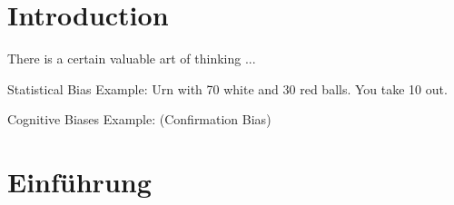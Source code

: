 \ifEnglish

\section{Introduction}


\begin{frame}[standout]
    There is a certain valuable art of thinking ...
\end{frame}



\begin{frame}[c]{Statistical Bias}
    Example: Urn with 70 white and 30 red balls. \newline
    \newline \pause
    You take 10 out.
\end{frame}

\begin{frame}[c]{Cognitive Biases}
    Example:\pause
    \newline \pause
    (Confirmation Bias)
\end{frame}

\else

\section{Einführung}



